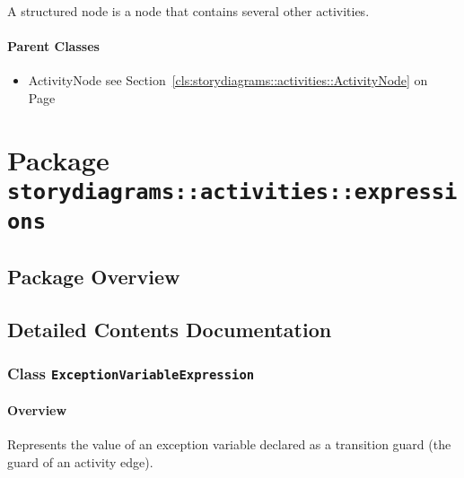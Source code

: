	
			
A structured node is a node that contains several other activities.	
		
	



\paragraph{Parent Classes}
\begin{itemize}
\item ActivityNode see Section~\ref{cls:storydiagrams::activities::ActivityNode} on Page~\pageref{cls:storydiagrams::activities::ActivityNode}\end{itemize}
\newpage
		


\section{Package \bfseries \texttt{storydiagrams::activities::expressions}\normalfont}
\subsection{Package Overview}
	
			
		



\subsection{Detailed Contents Documentation}
\subsubsection{\Large{Class \bfseries \texttt{ExceptionVariableExpression}\normalfont}}
\label{cls:storydiagrams::activities::expressions::ExceptionVariableExpression} 
\paragraph{Overview}

	
			
Represents the value of an exception variable declared as a transition guard (the guard of an activity edge).	
		
